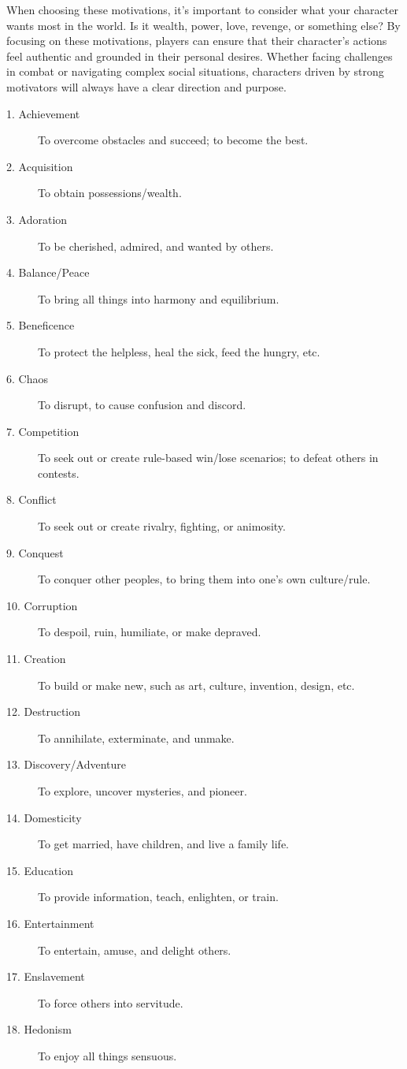 \documentclass[12pt]{book}
\begin{document}
When choosing these motivations, it's important to consider what your character wants most in the world. Is it wealth, power, love, revenge, or something else? By focusing on these motivations, players can ensure that their character's actions feel authentic and grounded in their personal desires. Whether facing challenges in combat or navigating complex social situations, characters driven by strong motivators will always have a clear direction and purpose.

\begin{description}
    \item[1. Achievement] To overcome obstacles and succeed; to become the best.
    \item[2. Acquisition] To obtain possessions/wealth.
    \item[3. Adoration] To be cherished, admired, and wanted by others.
    \item[4. Balance/Peace] To bring all things into harmony and equilibrium.
    \item[5. Beneficence] To protect the helpless, heal the sick, feed the hungry, etc.
    \item[6. Chaos] To disrupt, to cause confusion and discord.
    \item[7. Competition] To seek out or create rule-based win/lose scenarios; to defeat others in contests.
    \item[8. Conflict] To seek out or create rivalry, fighting, or animosity.
    \item[9. Conquest] To conquer other peoples, to bring them into one’s own culture/rule.
    \item[10. Corruption] To despoil, ruin, humiliate, or make depraved.
    \item[11. Creation] To build or make new, such as art, culture, invention, design, etc.
    \item[12. Destruction] To annihilate, exterminate, and unmake.
    \item[13. Discovery/Adventure] To explore, uncover mysteries, and pioneer.
    \item[14. Domesticity] To get married, have children, and live a family life.
    \item[15. Education] To provide information, teach, enlighten, or train.
    \item[16. Entertainment] To entertain, amuse, and delight others.
    \item[17. Enslavement] To force others into servitude.
    \item[18. Hedonism] To enjoy all things sensuous.

\end{description}
\end{document}
